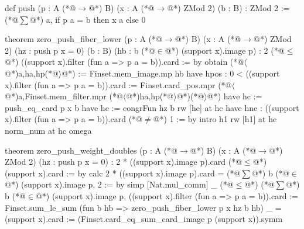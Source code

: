 def push (p : A (*@$\to$@*) B) (x : A (*@$\to$@*) ZMod 2) (b : B) : ZMod 2 :=
  (*@$\sum$@*) a, if p a = b then x a else 0

theorem zero_push_fiber_lower (p : A (*@$\to$@*) B) (x : A (*@$\to$@*) ZMod 2) (hz : push p x = 0)
    (b : B) (hb : b (*@$\in$@*) (support x).image p) :
    2 (*@$\le$@*) ((support x).filter (fun a => p a = b)).card := by
  obtain (*@$\langle$@*)a,ha,hp(*@$\rangle$@*) := Finset.mem_image.mp hb
  have hpos : 0 < ((support x).filter (fun a => p a = b)).card :=
    Finset.card_pos.mpr (*@$\langle$@*)a,Finset.mem_filter.mpr (*@$\langle$@*)ha,hp(*@$\rangle$@*)(*@$\rangle$@*)
  have hc := push_eq_card p x b
  have he := congrFun hz b
  rw [he] at hc
  have hne : ((support x).filter (fun a => p a = b)).card (*@$\ne$@*) 1 := by
    intro h1
    rw [h1] at hc
    norm_num at hc
  omega

theorem zero_push_weight_doubles (p : A (*@$\to$@*) B) (x : A (*@$\to$@*) ZMod 2) (hz : push p x = 0) :
    2 * ((support x).image p).card (*@$\le$@*) (support x).card := by
  calc
    2 * ((support x).image p).card = (*@$\sum$@*) b (*@$\in$@*) (support x).image p, 2 := by simp [Nat.mul_comm]
    _ (*@$\le$@*) (*@$\sum$@*) b (*@$\in$@*) (support x).image p, ((support x).filter (fun a => p a = b)).card :=
      Finset.sum_le_sum (fun b hb => zero_push_fiber_lower p x hz b hb)
    _ = (support x).card := (Finset.card_eq_sum_card_image p (support x)).symm
